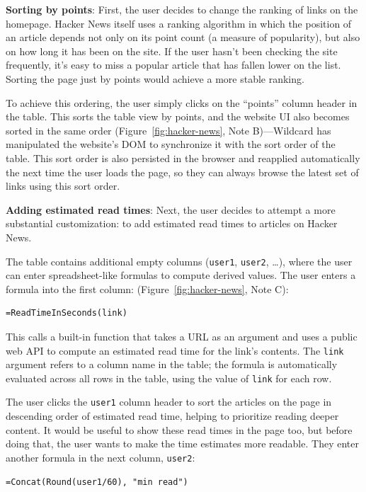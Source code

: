 \documentclass[sigplan,screen,10pt,anonymous,review]{acmart}
\begin{document}
\textbf{Sorting by points}: First, the user decides to change the
ranking of links on the homepage. Hacker News itself uses a ranking
algorithm in which the position of an article depends not only on its
point count (a measure of popularity), but also on how long it has been
on the site. If the user hasn't been checking the site frequently, it's
easy to miss a popular article that has fallen lower on the list.
Sorting the page just by points would achieve a more stable ranking.

To achieve this ordering, the user simply clicks on the ``points''
column header in the table. This sorts the table view by points, and the
website UI also becomes sorted in the same order
(Figure~\ref{fig:hacker-news}, Note B)---Wildcard has manipulated the
website's DOM to synchronize it with the sort order of the table. This
sort order is also persisted in the browser and reapplied automatically
the next time the user loads the page, so they can always browse the
latest set of links using this sort order.

\textbf{Adding estimated read times}: Next, the user decides to attempt
a more substantial customization: to add estimated read times to
articles on Hacker News.

The table contains additional empty columns (\texttt{user1},
\texttt{user2}, \ldots), where the user can enter spreadsheet-like
formulas to compute derived values. The user enters a formula into the
first column: (Figure~\ref{fig:hacker-news}, Note C):

\begin{verbatim}
=ReadTimeInSeconds(link)
\end{verbatim}

This calls a built-in function that takes a URL as an argument and uses
a public web API to compute an estimated read time for the link's
contents. The \texttt{link} argument refers to a column name in the
table; the formula is automatically evaluated across all rows in the
table, using the value of \texttt{link} for each row.

The user clicks the \texttt{user1} column header to sort the articles on
the page in descending order of estimated read time, helping to
prioritize reading deeper content. It would be useful to show these read
times in the page too, but before doing that, the user wants to make the
time estimates more readable. They enter another formula in the next
column, \texttt{user2}:

\begin{verbatim}
=Concat(Round(user1/60), "min read")
\end{verbatim}
\end{document}
